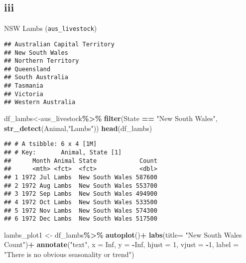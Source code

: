 \documentclass[
]{article}
\newenvironment{Shaded}{\begin{snugshade}}{\end{snugshade}}
\newcommand{\AttributeTok}[1]{\textcolor[rgb]{0.13,0.29,0.53}{#1}}
\newcommand{\ConstantTok}[1]{\textcolor[rgb]{0.56,0.35,0.01}{#1}}
\newcommand{\DecValTok}[1]{\textcolor[rgb]{0.00,0.00,0.81}{#1}}
\newcommand{\FunctionTok}[1]{\textcolor[rgb]{0.13,0.29,0.53}{\textbf{#1}}}
\newcommand{\NormalTok}[1]{#1}
\newcommand{\OtherTok}[1]{\textcolor[rgb]{0.56,0.35,0.01}{#1}}
\newcommand{\SpecialCharTok}[1]{\textcolor[rgb]{0.81,0.36,0.00}{\textbf{#1}}}
\newcommand{\StringTok}[1]{\textcolor[rgb]{0.31,0.60,0.02}{#1}}
\begin{document}
\hypertarget{iii}{%
\subsection{iii}\label{iii}}

NSW Lambs (\texttt{aus\_livestock})

\begin{Shaded}
\end{Shaded}

\begin{verbatim}
## Australian Capital Territory
## New South Wales
## Northern Territory
## Queensland
## South Australia
## Tasmania
## Victoria
## Western Australia
\end{verbatim}

\begin{Shaded}
\begin{Highlighting}[]
\NormalTok{df\_lambs}\OtherTok{\textless{}{-}}\NormalTok{aus\_livestock}\SpecialCharTok{\%\textgreater{}\%}
  \FunctionTok{filter}\NormalTok{(State }\SpecialCharTok{==} \StringTok{"New South Wales"}\NormalTok{, }\FunctionTok{str\_detect}\NormalTok{(Animal,}\StringTok{"Lambs"}\NormalTok{))}
\FunctionTok{head}\NormalTok{(df\_lambs)}
\end{Highlighting}
\end{Shaded}

\begin{verbatim}
## # A tsibble: 6 x 4 [1M]
## # Key:       Animal, State [1]
##      Month Animal State            Count
##      <mth> <fct>  <fct>            <dbl>
## 1 1972 Jul Lambs  New South Wales 587600
## 2 1972 Aug Lambs  New South Wales 553700
## 3 1972 Sep Lambs  New South Wales 494900
## 4 1972 Oct Lambs  New South Wales 533500
## 5 1972 Nov Lambs  New South Wales 574300
## 6 1972 Dec Lambs  New South Wales 517500
\end{verbatim}

\begin{Shaded}
\begin{Highlighting}[]
\NormalTok{lambs\_plot1 }\OtherTok{\textless{}{-}}\NormalTok{ df\_lambs}\SpecialCharTok{\%\textgreater{}\%}
                \FunctionTok{autoplot}\NormalTok{()}\SpecialCharTok{+}
                \FunctionTok{labs}\NormalTok{(}\AttributeTok{title=} \StringTok{"New South Wales Count"}\NormalTok{)}\SpecialCharTok{+}
  \FunctionTok{annotate}\NormalTok{(}\StringTok{"text"}\NormalTok{, }\AttributeTok{x =} \ConstantTok{Inf}\NormalTok{, }\AttributeTok{y =} \SpecialCharTok{{-}}\ConstantTok{Inf}\NormalTok{, }\AttributeTok{hjust =} \DecValTok{1}\NormalTok{, }\AttributeTok{vjust =} \SpecialCharTok{{-}}\DecValTok{1}\NormalTok{,}
           \AttributeTok{label =} \StringTok{"There is no obvious seasonality or trend"}\NormalTok{)}
\end{Highlighting}
\end{Shaded}
\end{document}
